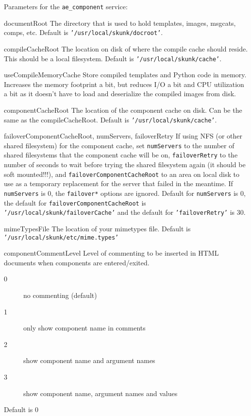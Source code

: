 \documentclass[titlepage]{manual}
\begin{document}
Parameters for the \texttt{ae_component} service:
\begin{argdesc}
\item[documentRoot]
The directory that is used to hold templates, images, msgcats, comps,
etc.
Default is \texttt{'/usr/local/skunk/docroot'}.
\item[compileCacheRoot] 
The location on disk of where the compile cache should reside.  This
should be a local filesystem.
Default is \texttt{'/usr/local/skunk/cache'}.
\item[useCompileMemoryCache] Store compiled templates and Python code
in memory.  Increases the memory footprint a bit, but reduces I/O a
bit and CPU utilization a bit as it doesn't have to load and
deserialize the compiled images from disk.
\item[componentCacheRoot] 
The location of the component cache on disk.  Can be the same as the
compileCacheRoot.
Default is \texttt{'/usr/local/skunk/cache'}.
\item[failoverComponentCacheRoot, numServers, failoverRetry] If using
NFS (or other shared filesystem) for the component cache, set
\texttt{numServers} to the number of shared filesystems that the
component cache will be on, \texttt{failoverRetry} to the number of
seconds to wait before trying the shared filesystem again (it should
be soft mounted!!!), and \texttt{failoverComponentCacheRoot} to an
area on local disk to use as a temporary replacement for the server
that failed in the meantime.  If \texttt{numServers} is 0, the
\texttt{failover*} options are ignored.  Default for
\texttt{numServers} is 0, the default for
\texttt{failoverComponentCacheRoot} is
\texttt{'/usr/local/skunk/failoverCache'} and the default for
\texttt{'failoverRetry'} is 30.
\item[mimeTypesFile] \nonscope
The location of your mimetypes file.  Default is \texttt{'/usr/local/skunk/etc/mime.types'}
\item[componentCommentLevel] 
Level of commenting to be inserted in HTML documents when components
are entered/exited.
\begin{description}
\item[0] no commenting (default)
\item[1] only show component name in comments
\item[2] show component name and argument names
\item[3] show component name, argument names and values
\end{description}
Default is 0
\end{argdesc}
\end{document}
